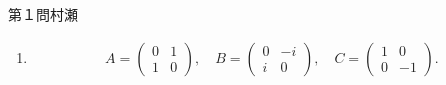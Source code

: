 \begin{answer}{第１問}{村瀬}
\begin{enumerate}
\item
  \begin{align*}
    A = \begin{pmatrix}0& 1 \\ 1 & 0\end{pmatrix},\quad
    B = \begin{pmatrix}0& -i \\ i & 0\end{pmatrix},\quad
    C = \begin{pmatrix}1& 0 \\ 0 & -1\end{pmatrix}.
  \end{align*}
\end{enumerate}
\end{answer}
